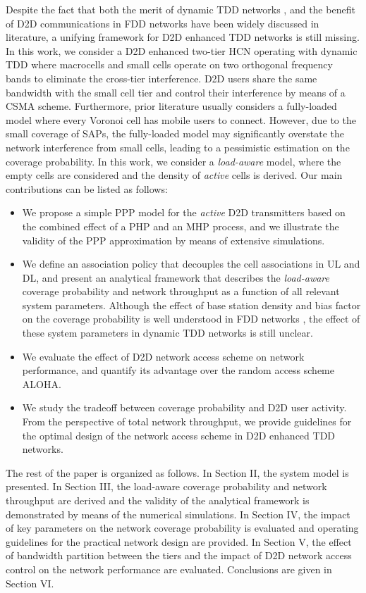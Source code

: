 \documentclass[twocolumn,english]{IEEEtran}
\theoremstyle{plain}
\theoremstyle{definition}
\begin{document}
Despite the fact that both the merit of dynamic TDD networks \cite{DUDC,DUDO},
and the benefit of D2D communications in FDD networks \cite{SSFD,AMMS,ROID2D}
have been widely discussed in literature, a unifying framework for
D2D enhanced TDD networks is still missing. In this work, we consider
a D2D enhanced two-tier HCN operating with dynamic TDD where macrocells
and small cells operate on two orthogonal frequency bands to eliminate
the cross-tier interference. D2D users share the same bandwidth with
the small cell tier and control their interference by means of a CSMA
scheme. Furthermore, prior literature usually considers a fully-loaded
model where every Voronoi cell has mobile users to connect. However,
due to the small coverage of SAPs, the fully-loaded model may significantly
overstate the network interference from small cells, leading to a
pessimistic estimation on the coverage probability. In this work,
we consider a \emph{load-aware} model, where the empty cells are considered
and the density of \emph{active} cells is derived. Our main contributions
can be listed as follows:
\begin{itemize}
\item We propose a simple PPP model for the \emph{active} D2D transmitters
based on the combined effect of a PHP and an MHP process, and we illustrate
the validity of the PPP approximation by means of extensive simulations.
\item We define an association policy that decouples the cell associations
in UL and DL, and present an analytical framework that describes the
\emph{load-aware} coverage probability and network throughput as a
function of all relevant system parameters. Although the effect of
base station density and bias factor on the coverage probability is
well understood in FDD networks \cite{HCNW}, the effect of these
system parameters in dynamic TDD networks is still unclear.
\item We evaluate the effect of D2D network access scheme on network performance,
and quantify its advantage over the random access scheme ALOHA.
\item We study the tradeoff between coverage probability and D2D user activity.
From the perspective of total network throughput, we provide guidelines
for the optimal design of the network access scheme in D2D enhanced
TDD networks.
\end{itemize}
The rest of the paper is organized as follows. In Section II, the
system model is presented. In Section III, the load-aware coverage
probability and network throughput are derived and the validity of
the analytical framework is demonstrated by means of the numerical
simulations. In Section IV, the impact of key parameters on the network
coverage probability is evaluated and operating guidelines for the
practical network design are provided. In Section V, the effect of
bandwidth partition between the tiers and the impact of D2D network
access control on the network performance are evaluated. Conclusions
are given in Section VI.
\end{document}
